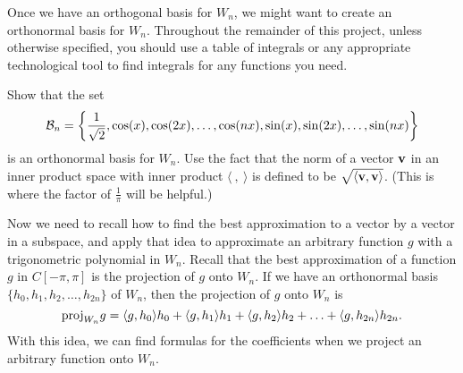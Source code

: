 Once we have an orthogonal basis for $W_n$, we might want to create an orthonormal basis for $W_n$. Throughout the remainder of this project, unless otherwise specified, you should use a table of integrals or any appropriate technological tool to find integrals for any functions you need. 

\begin{pactivity} \label{act:Fourier_basis} Show that the set
\[\mathcal{B}_n = \left\{\frac{1}{\sqrt{2}}, \cos(x), \cos(2x), \ldots, \cos(nx), \sin(x), \sin(2x), \ldots, \sin(nx)\right\}\]
is an orthonormal basis for $W_n$. Use the fact that the norm of a vector $\mathbf{v}$ in an inner product space with inner product $\langle \ , \ \rangle$ is defined to be $\sqrt{\langle \mathbf{v}, \mathbf{v} \rangle}$. (This is where the factor of $\frac{1}{\pi}$ will be helpful.)

\end{pactivity}

Now we need to recall how to find the best approximation to a vector by a vector in a subspace, and apply that idea to approximate an arbitrary function $g$ with a trigonometric polynomial in $W_n$. Recall that the best approximation of a function $g$ in $C[-\pi,\pi]$ is the projection of $g$ onto $W_n$. If we have an orthonormal basis $\{h_0, h_1, h_2, \ldots, h_{2n}\}$ of $W_n$, then the projection of $g$ onto $W_n$ is
\[\text{proj}_{W_n} g = \langle g,h_0 \rangle h_0 + \langle g,h_1 \rangle h_1 + \langle g,h_2 \rangle h_2 + \ldots + \langle g,h_{2n} \rangle h_{2n}.\]
With this idea, we can find formulas for the coefficients when we project an arbitrary function onto $W_n$.


